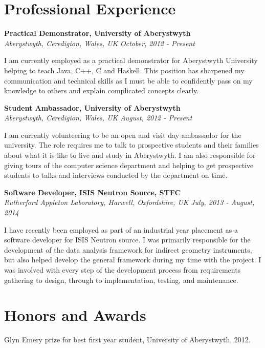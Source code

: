 \documentclass[margin,line]{res}
\begin{document}
\begin{resume}
\section{\sc Professional Experience}
{\bf Practical Demonstrator, University of Aberystwyth} \\
{\it Aberystwyth, Ceredigion, Wales, UK} \hfill {\it  October, 2012 - Present}

I am currently employed as a practical demonstrator for Aberystwyth University helping to teach Java, C++, C and Haskell. This position has sharpened my communication and technical skills as I must be able to confidently pass on my knowledge to others and explain complicated concepts clearly.

{\bf Student Ambassador, University of Aberystwyth}\\ 
{\it Aberystwyth, Ceredigion, Wales, UK} \hfill {\it August, 2012 - Present}

I am currently volunteering to be an open and visit day ambassador for the university. The role requires me to talk to prospective students and their families about what it is like to live and study in Aberystwyth. I am also responsible for giving tours of the computer science department and helping to get prospective students to talks and interviews conducted by the department on time.

{\bf Software Developer, ISIS Neutron Source, STFC} \\
{\it Rutherford Appleton Laboratory, Harwell, Oxfordshire, UK}  \hfill {\it July, 2013 - August, 2014}

I have recently been employed as part of an industrial year placement as a software developer for ISIS Neutron source. I was primarily responsible for the development of the data analysis framework for indirect geometry instruments, but also helped develop the general framework during my time with the project. I was involved with every step of the development process from requirements gathering to design, through to implementation, testing, and maintenance.

\section{\sc Honors and Awards}
Glyn Emery prize for best first year student, University of Aberystwyth, 2012.


\end{resume}
\end{document}
